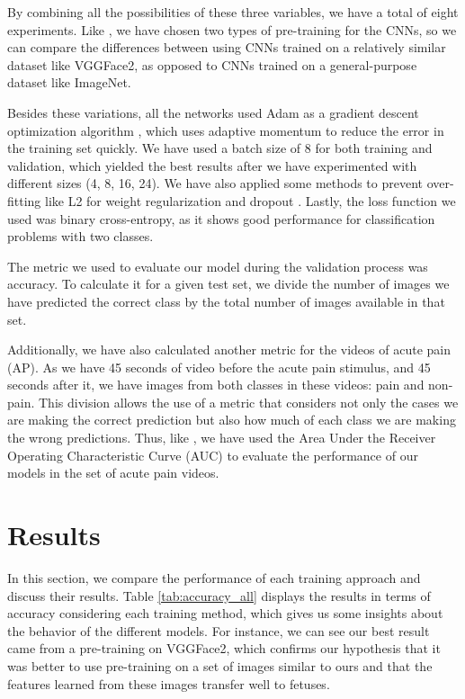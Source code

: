 By combining all the possibilities of these three variables, we have a total of eight experiments. Like \cite{abs-1807-01631}, we have chosen two types of pre-training for the CNNs, so we can compare the differences between using CNNs trained on a relatively similar dataset like VGGFace2, as opposed to CNNs trained on a general-purpose dataset like ImageNet.

Besides these variations, all the networks used Adam as a gradient descent optimization algorithm \citep{KingmaB14}, which uses adaptive momentum to reduce the error in the training set quickly. We have used a batch size of 8 for both training and validation, which yielded the best results after we have experimented with different sizes (4, 8, 16, 24). We have also applied some methods to prevent over-fitting like L2 for weight regularization \citep{Ng2004} and dropout \citep{SrivastavaHKSS14}. Lastly, the loss function we used was binary cross-entropy, as it shows good performance for classification problems with two classes.

The metric we used to evaluate our model during the validation process was accuracy. To calculate it for a given test set, we divide the number of images we have predicted the correct class by the total number of images available in that set.

Additionally, we have also calculated another metric for the videos of acute pain (AP). As we have 45 seconds of video before the acute pain stimulus, and 45 seconds after it, we have images from both classes in these videos: pain and non-pain.  This division allows the use of a metric that considers not only the cases we are making the correct prediction but also how much of each class we are making the wrong predictions. Thus, like \cite{abs-1807-01631}, we have used the Area Under the Receiver Operating Characteristic Curve (AUC) to evaluate the performance of our models in the set of acute pain videos.

\section{Results}

In this section, we compare the performance of each training approach and discuss their results. Table \ref{tab:accuracy_all} displays the results in terms of accuracy considering each training method, which gives us some insights about the behavior of the different models. For instance, we can see our best result came from a pre-training on VGGFace2, which confirms our hypothesis that it was better to use pre-training on a set of images similar to ours and that the features learned from these images transfer well to fetuses.

